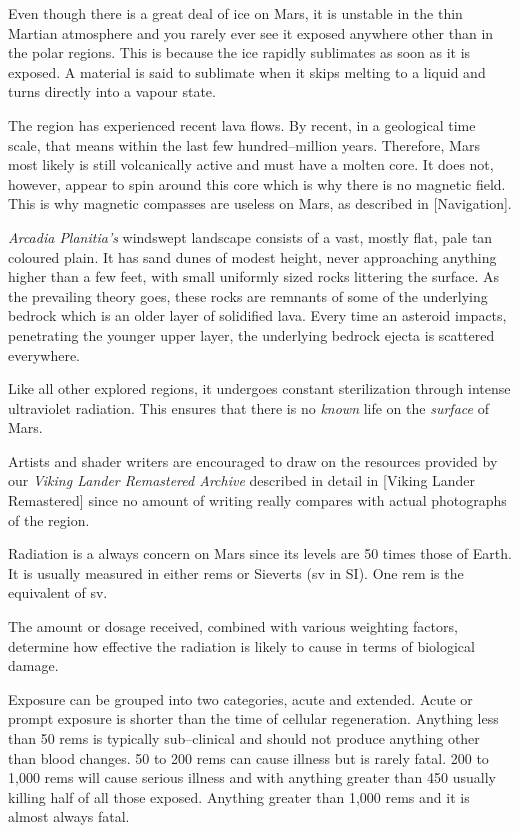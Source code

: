 Even though there is a great deal of ice on Mars, it is unstable in the thin Martian atmosphere and you rarely ever see it exposed anywhere other than in the polar regions. This is because the ice rapidly sublimates as soon as it is exposed. A material is said to sublimate when it skips melting to a liquid and turns directly into a vapour state. 

The region has experienced recent lava flows. By recent, in a geological time scale, that means within the last few hundred--million years. Therefore, Mars most likely is still volcanically active and must have a molten core. It does not, however, appear to spin around this core which is why there is no magnetic field. This is why magnetic compasses are useless on Mars, as described in [Navigation].

{\it Arcadia Planitia's} windswept landscape consists of a vast, mostly flat, pale tan coloured plain. It has sand dunes of modest height, never approaching anything higher than a few feet, with small uniformly sized rocks littering the surface. As the prevailing theory goes, these rocks are remnants of some of the underlying bedrock which is an older layer of solidified lava. Every time an asteroid impacts, penetrating the younger upper layer, the underlying bedrock ejecta is scattered everywhere.

Like all other explored regions, it undergoes constant sterilization through intense ultraviolet radiation. This ensures that there is no {\it known} life on the {\it surface} of Mars.

Artists and shader writers are encouraged to draw on the resources provided by our {\it Viking Lander Remastered Archive} described in detail in [Viking Lander Remastered] since no amount of writing really compares with actual photographs of the region.


Radiation is a always concern on Mars since its levels are 50 times those of Earth. It is usually measured in either rems or Sieverts (sv in SI). One rem is the equivalent of  sv.

The amount or dosage received, combined with various weighting factors, determine how effective the radiation is likely to cause in terms of biological damage.

Exposure can be grouped into two categories, acute and extended. Acute or prompt exposure is shorter than the time of cellular regeneration. Anything less than 50 rems is typically sub--clinical and should not produce anything other than blood changes. 50 to 200 rems can cause illness but is rarely fatal. 200 to 1,000 rems will cause serious illness and with anything greater than 450 usually killing half of all those exposed. Anything greater than 1,000 rems and it is almost always fatal.

